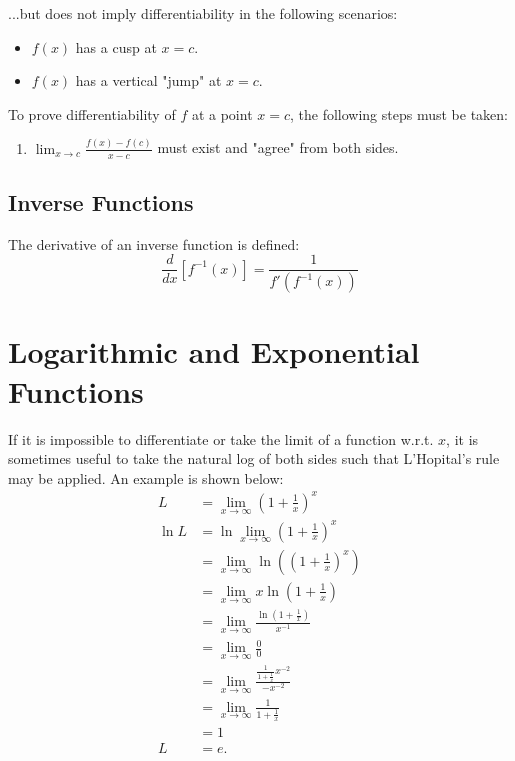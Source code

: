 ...but does not imply differentiability in the following scenarios:
\begin{itemize}
  \item $f(x)$ has a cusp at $x=c$.
  \item $f(x)$ has a vertical "jump" at $x=c$.
\end{itemize}

To prove differentiability of $f$ at a point $x=c$, the following steps must be
taken:
\begin{enumerate}
  \item $\lim_{x\to{c}} \frac{f(x)-f(c)}{x-c}$ must exist and "agree" from both
    sides.
\end{enumerate}

\subsection{Inverse Functions}
The derivative of an inverse function is defined:
\begin{equation}
  \frac{d}{dx}\left[f^{-1}(x)\right]=\frac{1}{f'(f^{-1}(x))}
\end{equation}

\section{Logarithmic and Exponential Functions}
If it is impossible to differentiate or take the limit of a function w.r.t. $x$,
it is sometimes useful to take the natural log of both sides such that
L'Hopital's rule may be applied. An example is shown below:
\begin{equation}
  \begin{aligned}
    L &= \lim_{x\to\infty} \left(1+\frac{1}{x}\right)^x \\
    \ln{L} &= \ln{\lim_{x\to\infty} \left(1+\frac{1}{x}\right)^x} \\
           &= \lim_{x\to\infty} \ln\left(\left(1+\frac{1}{x}\right)^x\right) \\
           &= \lim_{x\to\infty} x\ln\left(1+\frac{1}{x}\right) \\
           &= \lim_{x\to\infty} \frac{\ln\left(1+\frac{1}{x}\right)}{x^{-1}} \\
           &= \lim_{x\to\infty} \frac{0}{0} \\
           &= \lim_{x\to\infty} \frac{\frac{1}{1+\frac{1}{x}}x^{-2}}{-x^{-2}} \\
           &= \lim_{x\to\infty} \frac{1}{1+\frac{1}{x}} \\
           &= 1 \\
    L &= e.
  \end{aligned}
\end{equation}

